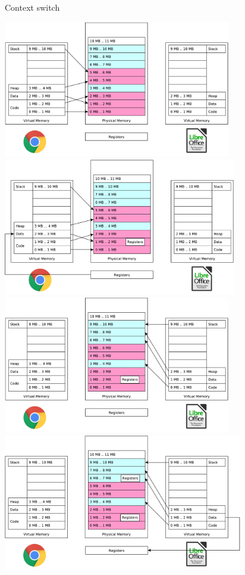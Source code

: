 \documentclass{beamer}
\begin{document}
\begin{frame}{Context switch}
  \begin{center}
     {
  \includegraphics[height=6cm]{ctx1}
}
     {
  \includegraphics[height=6cm]{ctx2}
}
     {
  \includegraphics[height=6cm]{ctx3}
}
     {
  \includegraphics[height=6cm]{ctx4}
}
  \end{center}
\end{frame}
\end{document}
